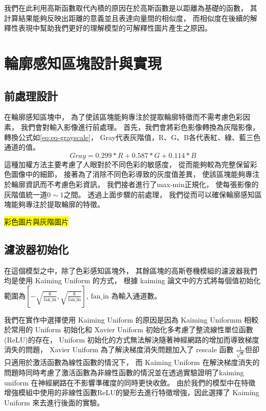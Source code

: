 \documentclass[class=NCU_thesis, crop=false]{standalone}
\begin{document}
	我們在此利用高斯函數取代內積的原因在於高斯函數是以距離為基礎的函數，
	其計算結果能夠反映出距離的意義並且表達向量間的相似度，
	而相似度在後續的解釋性表現中幫助我們更好的理解模型的可解釋性圖片產生之原因。

\pagebreak
\section{輪廓感知區塊設計與實現}
	\subsection{前處理設計}
	在輪廓感知區塊中，
	為了使該區塊能夠專注於提取輪廓特徵而不需考慮色彩因素，
	我們會對輸入影像進行前處理。
	首先，我們會將彩色影像轉換為灰階影像，
	轉換公式如\cref{eq:eq-grayscale}，
	Gray代表灰階值，R、G、B各代表紅、綠、藍三色通道的值。
	\begin{equation}
	    \label{eq:eq-grayscale}
	    Gray = 0.299 * R + 0.587 * G + 0.114 * B
	\end{equation}
	這種加權方法主要考慮了人眼對於不同色彩的敏感度，
	從而能夠較為完整保留彩色圖像中的細節，
	接著為了消除不同色彩導致的灰度值差異，
	使該區塊能夠專注於輪廓資訊而不考慮色彩資訊，
	我們接者進行了max-min正規化，
	使每張影像的灰階值統一道$0\sim1$之間。
	透過上面步驟的前處理，
	我們從而可以確保輪廓感知區塊能夠專注於提取輪廓的特徵。

	\colorbox {yellow}{彩色圖片與灰階圖片}

	\subsection{濾波器初始化}
	在這個模型之中，除了色彩感知區塊外，
	其餘區塊的高斯卷機模組的濾波器我們均是使用 Kaiming Uniform 的方式，
	根據 kaiming 論文\cite{DBLP:journals/corr/HeZR015}中的方式將每個值初始化範圍為$[-\sqrt{\frac{6}{\text{fan\_in}}}, \sqrt{\frac{6}{\text{fan\_in}}}]$,
	$\text{fan\_in}$ 為輸入通道數。

	我們在實作中選擇使用 Kaiming Uniform 的原因是因為 Kaiming Uniformm 相較於常用的 Uniform 初始化和 Xavier Uniform\cite{pmlr-v9-glorot10a} 初始化多考慮了整流線性單位函數(ReLU)的存在，
	Uniform 初始化的方式無法解決隨著神經網路的增加而導致梯度消失的問題，
	Xavier Uniform 為了解決梯度消失問題加入了 rescale 函數 $\frac{1}{\sqrt{\text{n}}}$但卻只適用於激活函數為線性函數的情況下，
	而 Kaiming Uniform 在解決梯度消失的問題時同時考慮了激活函數為非線性函數的情況並在\cite{DBLP:journals/corr/HeZR015}透過實驗證明了kaiming uniform 在神經網路在不影響準確度的同時更快收斂。
	由於我們的模型中在特徵增強模組中使用的非線性函數ReLU的變形去進行特徵增強，因此選擇了 Kaiming Uniform 來去進行後面的實驗。
\end{document}
